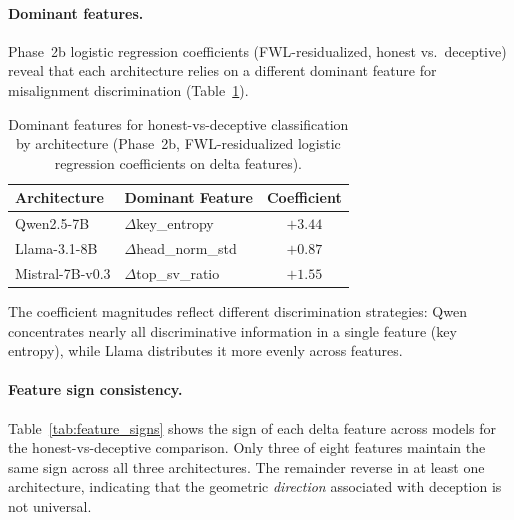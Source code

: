 \paragraph{Dominant features.}
Phase~2b logistic regression coefficients (FWL-residualized, honest vs.\ deceptive) reveal that each architecture relies on a different dominant feature for misalignment discrimination (Table~\ref{tab:dominant_features}).

\begin{table}[t]
  \centering
  \caption{Dominant features for honest-vs-deceptive classification by architecture (Phase~2b, FWL-residualized logistic regression coefficients on delta features).}
  \label{tab:dominant_features}
  \begin{tabular}{@{}llc@{}}
    \toprule
    Architecture & Dominant Feature & Coefficient \\
    \midrule
    Qwen2.5-7B     & $\Delta$key\_entropy      & $+3.44$ \\
    Llama-3.1-8B    & $\Delta$head\_norm\_std    & $+0.87$ \\
    Mistral-7B-v0.3 & $\Delta$top\_sv\_ratio     & $+1.55$ \\
    \bottomrule
  \end{tabular}
\end{table}

\noindent The coefficient magnitudes reflect different discrimination strategies: Qwen concentrates nearly all discriminative information in a single feature (key entropy), while Llama distributes it more evenly across features.

\paragraph{Feature sign consistency.}
Table~\ref{tab:feature_signs} shows the sign of each delta feature across models for the honest-vs-deceptive comparison.
Only three of eight features maintain the same sign across all three architectures.
The remainder reverse in at least one architecture, indicating that the geometric \emph{direction} associated with deception is not universal.

